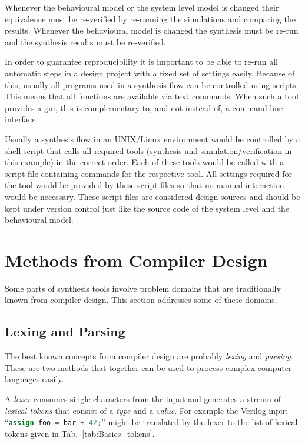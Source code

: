 Whenever the behavioural model or the system level model is
changed their equivalence must be re-verified by re-running the simulations
and comparing the results. Whenever the behavioural model is changed the
synthesis must be re-run and the synthesis results must be re-verified.

In order to guarantee reproducibility it is important to be able to re-run all
automatic steps in a design project with a fixed set of settings easily.
Because of this, usually all programs used in a synthesis flow can be
controlled using scripts. This means that all functions are available via
text commands. When such a tool provides a gui, this is complementary to,
and not instead of, a command line interface.

Usually a synthesis flow in an UNIX/Linux environment would be controlled by a
shell script that calls all required tools (synthesis and simulation/verification
in this example) in the correct order. Each of these tools would be called with
a script file containing commands for the respective tool. All settings required
for the tool would be provided by these script files so that no manual interaction
would be necessary. These script files are considered design sources and should
be kept under version control just like the source code of the system level and the
behavioural model.

\section{Methods from Compiler Design}

Some parts of synthesis tools involve problem domains that are traditionally known from
compiler design. This section addresses some of these domains.

\subsection{Lexing and Parsing}

The best known concepts from compiler design are probably {\it lexing} and {\it parsing}.
These are two methods that together can be used to process complex computer languages
easily. \cite{Dragonbook}

A {\it lexer} consumes single characters from the input and generates a stream of {\it lexical
tokens} that consist of a {\it type} and a {\it value}. For example the Verilog input
``\lstinline[language=Verilog]{assign foo = bar + 42;}'' might be translated by the lexer
to the list of lexical tokens given in Tab.~\ref{tab:Basics_tokens}.

